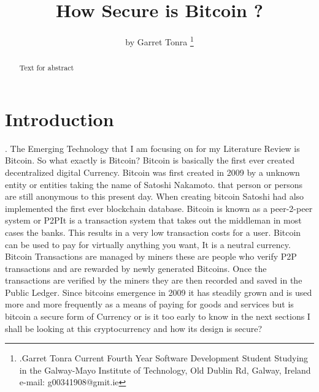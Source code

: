 \documentclass[report]{IEEEtran}
\begin{document}
\title{How Secure is Bitcoin ? }
\author{by Garret Tonra %
\thanks{.\newline Garret Tonra Current Fourth Year
Software Development Student Studying in the Galway-Mayo Institute of Technology, Old Dublin Rd, Galway, Ireland 
e-mail: g00341908@gmit.ie}%
}

\maketitle

\begin{abstract}
Text for abstract
\end{abstract}


\section{Introduction}.\newline
The Emerging Technology that I am focusing on for my Literature Review is Bitcoin. So what exactly is Bitcoin?\newline
Bitcoin is basically the first ever created decentralized digital Currency. Bitcoin was first created in 2009 by a unknown entity or entities taking the name of Satoshi Nakamoto. that person or persons are still anonymous to this present day. When creating bitcoin Satoshi had also implemented the first ever blockchain database. Bitcoin is known as a peer-2-peer system or P2P\newline It is a transaction system that takes out the middleman in most cases the banks. This results in a very low transaction costs for a user. Bitcoin can be used to pay for virtually anything you want, It is a neutral currency. Bitcoin Transactions are managed by miners these are people who verify P2P transactions and are rewarded by newly generated Bitcoins. Once the transactions are verified by the miners they are then recorded and saved in the Public Ledger. Since bitcoins emergence in 2009 it has steadily grown and is used more and more frequently as a means of paying for goods and services but is bitcoin a secure form of Currency or is it too early to know in the next sections I shall be looking at this cryptocurrency and how its design is secure?
\end{document}
